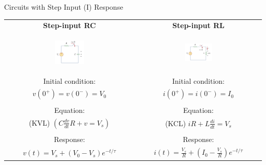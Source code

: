 \documentclass{beamer}
\begin{document}
\begin{frame}{Circuits with Step Input (I) Response}

\begin{table}[]
    \centering
    \setlength{\tabcolsep}{5mm}
    \begin{small}
    
    \begin{tabular}{c|c}
        \textbf{Step-input RC} & \textbf{Step-input RL}\\
        \begin{figure}
        \centering
        \includegraphics[width=0.35\textwidth]{img_1order/7_stepinputRC.png}
        \end{figure}
        &
        \begin{figure}
        \centering
        \includegraphics[width=0.34\textwidth]{img_1order/8_stepinputRL.png}
        \end{figure}
        \\
        Initial condition:&Initial condition:\\
        $v(0^+)=v(0^-)=V_0$&$i(0^+)=i(0^-)=I_0$\\
        &\\
        Equation:&Equation:\\
        (KVL) $(C\frac{dv}{dt}R+v=V_s)$&(KCL) $iR+L\frac{di}{dt}=V_s$\\
        &\\
        Response:&Response:\\
        $v(t)=V_s + (V_0-V_s)e^{-t/\tau}$&$i(t)=\frac{V_s}{R} + (I_0-\frac{V_s}{R})e^{-t/\tau}$\\
        
    \end{tabular}
            
    \end{small}
\end{table}

\end{frame}
\end{document}
